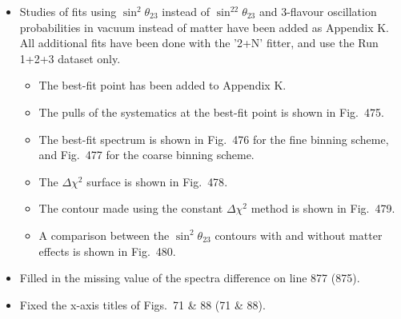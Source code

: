 \begin{itemize}
\item
  Studies of fits using $\sin^2\theta_{23}$ instead of $\sin^22\theta_{23}$ and 3-flavour oscillation 
  probabilities in vacuum instead of matter have been added as Appendix {\color{red}K}.
  All additional fits have been done with the
  '2+N' fitter, and use the Run 1+2+3 dataset only.
  \begin{itemize}
  \item The best-fit point has been added to Appendix {\color{red}K}.
  \item The pulls of the systematics at the best-fit point is shown in Fig.\ {\color{red}475}.
  \item The best-fit spectrum is shown in Fig.\ {\color{red}476} for the fine binning scheme, and
    Fig.\ {\color{red}477} for the coarse binning scheme.
  \item The $\Delta \chi^2$ surface is shown in Fig.\ {\color{red}478}.
  \item The contour made using the constant $\Delta \chi^2$ method is shown in Fig.\ {\color{red}479}.
  \item A comparison between the $\sin^2\theta_{23}$ contours with and without matter effects
    is shown in Fig.\ {\color{red}480}.
  \end{itemize}

\item Filled in the missing value of the spectra difference on line 877 {\color{red}(875)}.
\item Fixed the x-axis titles of Figs.\ 71 \& 88 {\color{red}(71 \& 88)}.

\end{itemize}


